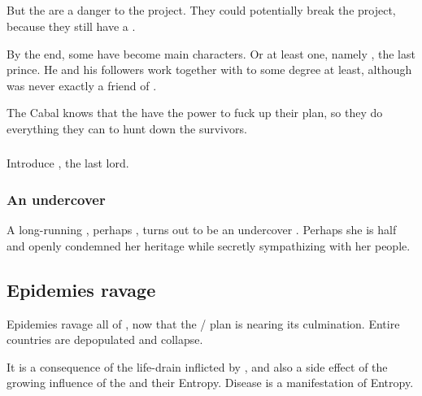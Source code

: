 \subsection{\Kezerad}
But the  are a danger to the \Sephirah{} project. They could potentially break the project, because they still have a .

By the end, some \Kezeradi{} have become main characters. Or at least one, namely , the last \Kezeradi{} prince. He and his followers work together with \Ishnaruchaefir{}\dash to some degree at least, although \Ishnaruchaefir{} was never exactly a friend of \Kezerad. 

The Cabal knows that the \Kezeradi{} have the power to fuck up their plan, so they do everything they can to hunt down the survivors.





\subsubsection[Sithiyacan]{\Sithiyacaan}
Introduce , the last  lord. 





\subsubsection{An undercover \Kezeradi}
A long-running \resphan, perhaps \Achsah, turns out to be an undercover \Kezeradi. Perhaps she is half \Kezeradi{} and openly condemned her heritage while secretly sympathizing with her people.









\subsection{Epidemies ravage \Azmith}
Epidemies ravage all of \Azmith, now that the \Iquin/ plan is nearing its culmination. 
Entire countries are depopulated and collapse. 

It is a consequence of the life-drain inflicted by \Iquin, and also a side effect of the growing influence of the \banelords and their Entropy.
Disease is a manifestation of Entropy.

